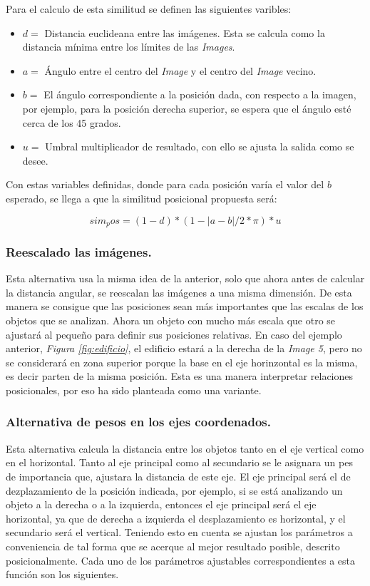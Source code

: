 Para el calculo de esta similitud se definen las siguientes varibles:
\begin{itemize}
    \item $d =$ Distancia euclideana entre las im\'agenes. Esta se calcula como la distancia m\'inima entre los l\'imites de las \textit{Images}.

    \item $a =$ \'Angulo entre el centro del \textit{Image} y  el centro del \textit{Image} vecino.

    \item $b =$  El ángulo correspondiente a la posición dada, con respecto a la imagen, por ejemplo, para la posición derecha superior, se espera que el ángulo esté cerca de los 45 grados.

    \item $u =$  Umbral multiplicador de resultado, con ello se ajusta la salida como se desee.
\end{itemize}
Con estas variables definidas, donde para cada posici\'on var\'ia el valor del $b$ esperado, se llega a que la similitud posicional propuesta ser\'a:

\[sim_pos = (1-d)*(1- |a-b|/2*\pi) * u \]

\subsubsection{Reescalado las imágenes.}

Esta alternativa usa la misma idea de la anterior, solo que ahora antes de calcular la distancia angular, se reescalan las imágenes a una misma dimensión. De esta manera se consigue que las posiciones sean más importantes que las escalas de los objetos que se analizan. Ahora un objeto con mucho más escala que otro se ajustará al pequeño para definir sus posiciones relativas. En caso del ejemplo anterior, \textit{Figura \ref{fig:edificio}}, el edificio estar\'a a la derecha de la \textit{Image 5}, pero no se considerar\'a en zona superior porque la base en el eje horinzontal es la misma, es decir parten de la misma posici\'on. Esta es una manera interpretar relaciones posicionales, por eso ha sido planteada como una variante.

\subsubsection{Alternativa de pesos en los ejes coordenados.}

Esta alternativa calcula la distancia entre los objetos tanto en el eje vertical como en el horizontal. Tanto al eje principal como al secundario se le asignara un pes de importancia que, ajustara la distancia de este eje. El eje principal ser\'a el de dezplazamiento de la posici\'on indicada, por ejemplo, si se está analizando un objeto a la derecha o a la izquierda, entonces el eje principal será el eje horizontal, ya que de derecha a izquierda el desplazamiento es horizontal, y el secundario será el vertical. Teniendo esto en cuenta se ajustan los parámetros a conveniencia de tal forma que se acerque al mejor resultado posible, descrito posicionalmente. Cada uno de los parámetros ajustables correspondientes a esta función son los siguientes.

